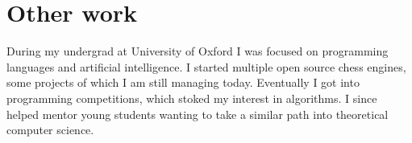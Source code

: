 \documentclass[10pt]{article}
\begin{document}
\section{Other work}

During my undergrad at University of Oxford I was focused on programming languages and artificial intelligence.
I started multiple open source chess engines, some projects of which I am still managing today.
Eventually I got into programming competitions, which stoked my interest in algorithms.
I since helped mentor young students wanting to take a similar path into theoretical computer science.



\end{document}
